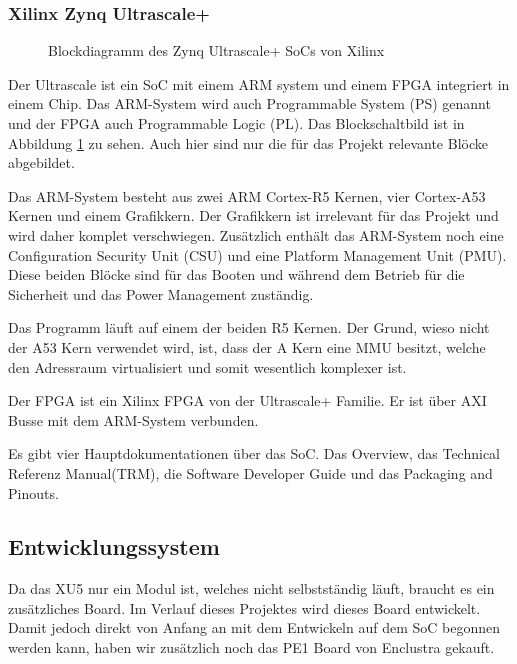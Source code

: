 \documentclass{article}
\begin{document}
\subsubsection*{Xilinx Zynq Ultrascale+}
\begin{figure}[tb]
    \caption{Blockdiagramm des Zynq Ultrascale+ SoCs von Xilinx}
    \label{fig:bd_soc}
\end{figure}

Der Ultrascale ist ein SoC mit einem ARM system und einem FPGA integriert in einem Chip. Das ARM-System wird auch Programmable System (PS) genannt und der FPGA auch Programmable Logic (PL). Das Blockschaltbild ist in Abbildung \ref{fig:bd_soc} zu sehen. Auch hier sind nur die für das Projekt relevante Blöcke abgebildet. 

Das ARM-System besteht aus zwei ARM Cortex-R5 Kernen, vier Cortex-A53 Kernen und einem Grafikkern. Der Grafikkern ist irrelevant für das Projekt und wird daher komplet verschwiegen. Zusätzlich enthält das ARM-System noch eine Configuration Security Unit (CSU) und eine Platform Management Unit (PMU). Diese beiden Blöcke sind für das Booten und während dem Betrieb für die Sicherheit und das Power Management zuständig.

Das Programm läuft auf einem der beiden R5 Kernen. Der Grund, wieso nicht der A53 Kern verwendet wird, ist, dass der A Kern eine MMU besitzt, welche den Adressraum virtualisiert und somit wesentlich komplexer ist.

Der FPGA ist ein Xilinx FPGA von der Ultrascale+ Familie. Er ist über AXI Busse mit dem ARM-System verbunden.

Es gibt vier Hauptdokumentationen über das SoC. Das Overview, das Technical Referenz Manual(TRM), die Software Developer Guide und das Packaging and Pinouts.


\subsection{Entwicklungssystem}
Da das XU5 nur ein Modul ist, welches nicht selbstständig läuft, braucht es ein zusätzliches Board. Im Verlauf dieses Projektes wird dieses Board entwickelt. Damit jedoch direkt von Anfang an mit dem Entwickeln auf dem SoC begonnen werden kann, haben wir zusätzlich noch das PE1 Board von Enclustra gekauft. 
\end{document}
